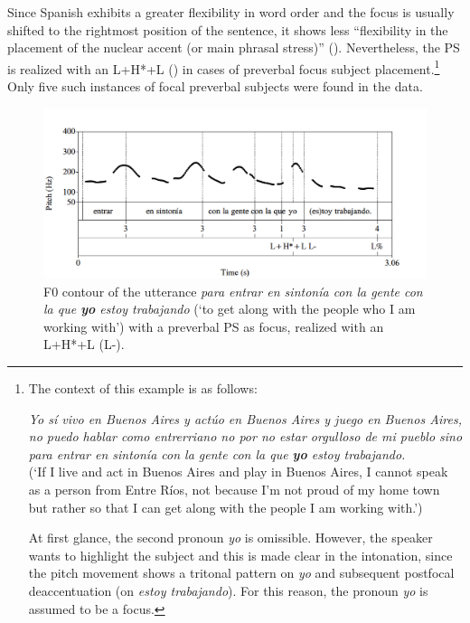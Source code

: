 \documentclass[output=paper]{langsci/langscibook}
\begin{document}
Since Spanish exhibits a greater flexibility in word order and the focus is usually shifted to the rightmost position of the sentence, it shows less ``flexibility in the placement of the nuclear accent (or main phrasal stress)'' (\citealt[358]{Hualde2015}). Nevertheless, the PS is realized with an L+H*+L () in cases of preverbal focus subject placement.\footnote{The context of this example is as follows:

\begin{exe}
\textit{Yo sí vivo en Buenos Aires y actúo en Buenos Aires y juego en Buenos Aires, no puedo hablar como entrerriano no por no estar orgulloso de mi pueblo sino para entrar en sintonía con la gente con la que \textbf{yo} estoy trabajando.}\\
(‘If I live and act in Buenos Aires and play in Buenos Aires, I cannot speak as a person from Entre Ríos, not because I’m not proud of my home town but rather so that I can get along with the people I am working with.’)
\end{exe}

At first glance, the second pronoun \textit{yo} is omissible. However, the speaker wants to highlight the subject and this is made clear in the intonation, since the pitch movement shows a tritonal pattern on \textit{yo} and subsequent postfocal deaccentuation (on \textit{estoy trabajando}). For this reason, the pronoun \textit{yo} is assumed to be a focus.} Only five such instances of focal preverbal subjects were found in the data. 


\begin{figure}
\includegraphics[width=\textwidth]{figures/pes-img10.png}
\caption{F0 contour of the utterance \textit{para entrar en sintonía con la gente con la que \textbf{yo} estoy trabajando} (‘to get along with the people who I am working with’) with a preverbal PS as focus, realized with an L+H*+L (L-).} 
\label{fig:pes:10}
\end{figure}
\end{document}
